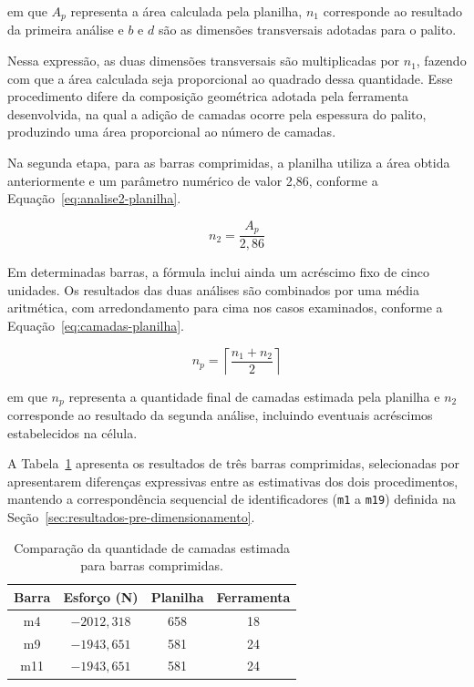 \noindent em que $A_p$ representa a área calculada pela planilha, $n_1$ corresponde ao resultado da primeira análise e $b$ e $d$ são as dimensões transversais adotadas para o palito.

Nessa expressão, as duas dimensões transversais são multiplicadas por $n_1$, fazendo com que a área calculada seja proporcional ao quadrado dessa quantidade. Esse procedimento difere da composição geométrica adotada pela ferramenta desenvolvida, na qual a adição de camadas ocorre pela espessura do palito, produzindo uma área proporcional ao número de camadas.

Na segunda etapa, para as barras comprimidas, a planilha utiliza a área obtida anteriormente e um parâmetro numérico de valor 2,86, conforme a Equação~\ref{eq:analise2-planilha}.

\begin{equation}
    n_2 = \frac{A_p}{2,86}
    \label{eq:analise2-planilha}
\end{equation}

Em determinadas barras, a fórmula inclui ainda um acréscimo fixo de cinco unidades. Os resultados das duas análises são combinados por uma média aritmética, com arredondamento para cima nos casos examinados, conforme a Equação~\ref{eq:camadas-planilha}.

\begin{equation}
    n_p =
    \left\lceil
    \frac{n_1+n_2}{2}
    \right\rceil
    \label{eq:camadas-planilha}
\end{equation}

\noindent em que $n_p$ representa a quantidade final de camadas estimada pela planilha e $n_2$ corresponde ao resultado da segunda análise, incluindo eventuais acréscimos estabelecidos na célula.

A Tabela~\ref{tab:comparacao-camadas} apresenta os resultados de três barras comprimidas, selecionadas por apresentarem diferenças expressivas entre as estimativas dos dois procedimentos, mantendo a correspondência sequencial de identificadores (\texttt{m1} a \texttt{m19}) definida na Seção~\ref{sec:resultados-pre-dimensionamento}.

\begin{table}[H]
    \centering
    \caption{Comparação da quantidade de camadas
    estimada para barras comprimidas.}
    \label{tab:comparacao-camadas}
    \begin{tabular}{c c c c}
        \hline
        \textbf{Barra} &
        \textbf{Esforço (N)} &
        \textbf{Planilha} &
        \textbf{Ferramenta} \\
        \hline
        m4  & $-2012,318$ & 658 & 18 \\
        m9  & $-1943,651$ & 581 & 24 \\
        m11 & $-1943,651$ & 581 & 24 \\
        \hline
    \end{tabular}
\end{table}

